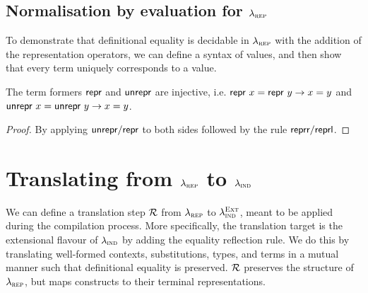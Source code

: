 \subsection{Normalisation by evaluation for $\lambda_{\textsc{rep}}$}

To demonstrate that definitional equality is decidable in $\lambda_{\textsc{rep}}$ with the addition
of the representation operators, we can define a syntax of values, and then show that
every term uniquely corresponds to a value.

\begin{lemma}
	The term formers $\textsf{repr}{}$ and $\textsf{unrepr}{}$ are injective, i.e.
	$\textsf{repr}\ x = \textsf{repr}\ y \to x = y$ and $\textsf{unrepr}\ x = \textsf{unrepr}\ y \to x = y$.
	\begin{proof}
				By applying $\textsf{unrepr}/\textsf{repr}$ to both sides
				followed by the rule $\textsf{reprr}/\textsf{reprl}$.
	\end{proof}
\end{lemma}


\section{Translating from $\lambda_{\textsc{rep}}$ to $\lambda_{\textsc{ind}}$}

We can define a translation step $\mathcal{R}$ from $\lambda_{\textsc{rep}}$ to
$\lambda_{\textsc{ind}}^{\textsc{Ext}}$, meant to be applied during the compilation process.
More specifically, the translation target is the extensional flavour of
$\lambda_{\textsc{ind}}$ by adding the equality reflection rule. We do this by translating
well-formed contexts, substitutions, types, and terms in a mutual manner such
that definitional equality is preserved. $\mathcal{R}$ preserves the structure of
$\lambda_{\textsc{rep}}$, but maps constructs to their terminal representations.

